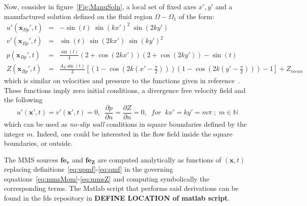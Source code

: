 \documentclass[12pt]{article}
\begin{document}
Now, consider in figure~\ref{Fig:ManuSoln}, a local set of fixed axes $x',y'$ and a manufactured solution defined on the fluid region $\Omega - \Omega_1$ of the form:
%
\begin{eqnarray}
   u'(\mathbf{x}_{Bp}',t) &=& -\sin(t) \; \sin(kx')^2 \; \sin(2ky') \label{eq:upmf} \\
   v'(\mathbf{x}_{Bp}',t) &=&   \sin(t) \; \sin(2kx') \; \sin(ky')^2 \label{eq:vpmf} \\
   p(\mathbf{x}_{Bp}',t) &=& \frac{\sin(t)}{4} \left( 2+\cos(2kx') \right) \left( 2+\cos(2ky') \right) - \sin(t) \label{eq:pmf} \\
   Z(\mathbf{x}_{Bp}',t) &=& \frac{A_Z \sin(t)}{3} \left[ \left( 1-\cos(2k(x'-\frac{\pi}{2})) \right)
                                                                                   \left( 1-\cos(2k(y'-\frac{\pi}{2})) \right) - 1 \right] + Z_{mean} \label{eq:qmf}
\end{eqnarray}
%
which is similar on velocities and pressure to the functions given in reference~\cite{Weinan:1}.  These functions imply zero initial conditions, a divergence free velocity field and the following
%
\begin{equation}
   u'(\mathbf{x}',t)=v'(\mathbf{x}',t)=0, \; \; \frac{\partial p}{\partial n} = \frac{\partial Z}{\partial n}=0, \; \;
   for \; \; kx'=ky'= m \pi \; ; \; m \in \mathbb{N}
\end{equation}
%
which can be used as \textit{no-slip wall} conditions in square boundaries defined by the integer $m$. Indeed, one could be interested in the flow field inside the square boundaries, or outside.

 The MMS sources $\mathbf{fe_v}$ and $\mathbf{fe_Z}$ are computed analytically as functions of $(\mathbf{x},t)$ replacing definitions~\eqref{eq:upmf}-\eqref{eq:qmf} in the governing equations~\eqref{eq:mmsMom}-\eqref{eq:mmsZ} and computing symbolically the corresponding terms. The Matlab script that performs said derivations can be found in the fds repository in \textbf{DEFINE LOCATION of matlab script}.
\end{document}
